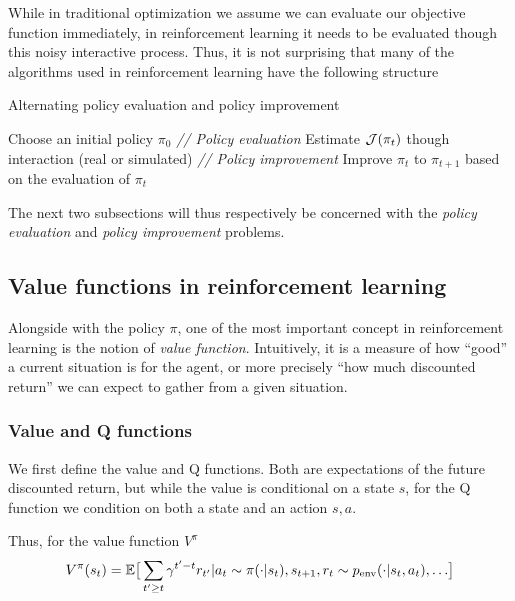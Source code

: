 While in traditional optimization we assume we can evaluate our objective function immediately, in reinforcement learning it needs to be evaluated though this noisy interactive process. Thus, it is not surprising that many of the algorithms used in reinforcement learning have the following structure

\begin{center}
\begin{minipage}{0.9\textwidth}
\begin{algorithm}[H]
\caption{Alternating policy evaluation and policy improvement}
\label{alg:eval_improv}
\begin{algorithmic}[1]
\STATE Choose an initial policy $\pi_0$ 
\STATE \textit{// Policy evaluation}
\STATE Estimate ${\mathcal{J}}(\pi_t)$ though interaction (real or simulated)
\STATE \textit{// Policy improvement}
\STATE Improve $\pi_t$ to $\pi_{t+1}$ based on the evaluation of $\pi_t$
\ENDFOR
\end{algorithmic}
\end{algorithm}
\end{minipage}
\end{center}
\vspace{1em}

The next two subsections will thus respectively be concerned with the \emph{policy evaluation} and \emph{policy improvement} problems.

\subsection{Value functions in reinforcement learning}
Alongside with the policy $\pi$, one of the most important concept in reinforcement learning is the notion of \emph{value function}.
Intuitively, it is a measure of how ``good'' a current situation is for the agent, or more precisely ``how much discounted return'' we can expect to gather from a given situation.

\subsubsection{Value and Q functions}
We first define the value and Q functions. Both are expectations of the future discounted return, but while the value is conditional on a state $s$, for the Q function we condition on both a state and an action $s, a$.

Thus, for the value function $V^\pi$
\begin{equation}
    V^\pi(s_t) = \mathbb{E} \big[ \sum_{t' \ge t} \gamma^{t'-t} r_{t'} | {a_t \sim \pi(\cdot|s_t), s_{t+1}, r_t \sim p_{\text{env}}(\cdot | s_t, a_t), \dots} \big] 
\end{equation}

